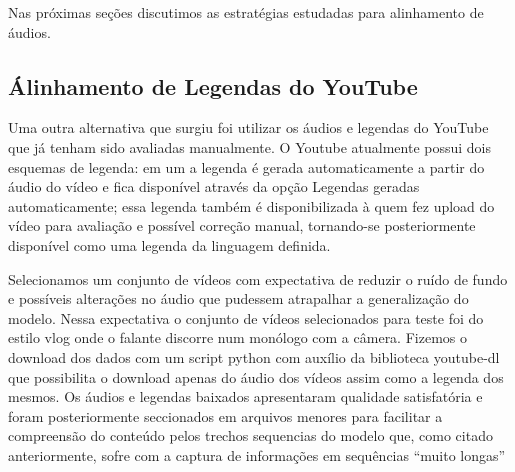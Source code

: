Nas próximas seções discutimos as estratégias estudadas para alinhamento de áudios. 

\subsection{Álinhamento de Legendas do YouTube}
\label{sec:youtube}
Uma outra alternativa que surgiu foi utilizar os áudios e legendas do YouTube que já tenham sido avaliadas manualmente. O Youtube atualmente possui dois esquemas de legenda: em um a legenda é gerada automaticamente a partir do áudio do vídeo e fica disponível através da opção Legendas geradas automaticamente; essa legenda também é disponibilizada à quem fez upload do vídeo para avaliação e possível correção manual, tornando-se posteriormente disponível como uma legenda da linguagem definida.

Selecionamos um conjunto de vídeos com expectativa de reduzir o ruído de fundo e possíveis alterações no áudio que pudessem atrapalhar a generalização do modelo. Nessa expectativa o conjunto de vídeos selecionados para teste foi do estilo vlog onde o falante discorre num monólogo com a câmera. Fizemos o download dos dados com um script python com auxílio da biblioteca youtube-dl que possibilita o download apenas do áudio dos vídeos assim como a legenda dos mesmos. Os áudios e legendas baixados apresentaram qualidade satisfatória e foram posteriormente seccionados em arquivos menores para facilitar a compreensão do conteúdo pelos trechos sequencias do modelo que, como citado anteriormente, sofre com a captura de informações em sequências ``muito longas'' 


